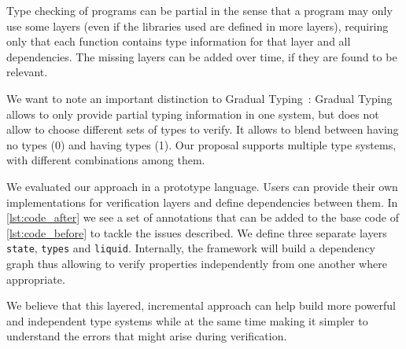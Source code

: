 \documentclass{easychair}
\begin{document}
Type checking of programs can be partial in the sense that a program may only use some layers (even if the libraries used are defined in more layers), requiring only that each function contains type information for that layer and all dependencies. The missing layers can be added over time, if they are found to be relevant.


We want to note an important distinction to Gradual Typing~\cite{gradual,gradual-objects}: Gradual Typing allows to only provide partial typing information in one system, but does not allow to choose different sets of types to verify. It allows to blend between having no types (0) and having types (1). Our proposal supports multiple type systems, with different combinations among them.

We evaluated our approach in a prototype language. Users can provide their own implementations for verification layers and define dependencies between them. In \autoref{lst:code_after} we see a set of annotations that can be added to the base code of \autoref{lst:code_before} to tackle the issues described. We define three separate layers \texttt{state}, \texttt{types} and \texttt{liquid}. Internally, the framework will build a dependency graph thus allowing to verify properties independently from one another where appropriate.

We believe that this layered, incremental approach can help build more powerful and independent type systems while at the same time making it simpler to understand the errors that might arise during verification.





\end{document}
